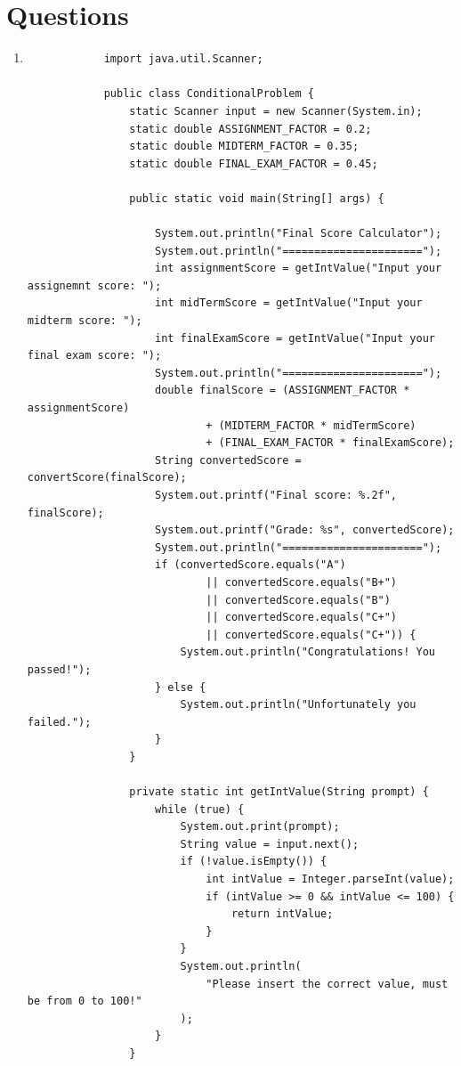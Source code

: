 \documentclass[12pt,titlepage]{article}
\begin{document}
\section*{Questions}
\begin{enumerate}
    \item {
        \begin{verbatim}
            import java.util.Scanner;

            public class ConditionalProblem {
                static Scanner input = new Scanner(System.in);
                static double ASSIGNMENT_FACTOR = 0.2;
                static double MIDTERM_FACTOR = 0.35;
                static double FINAL_EXAM_FACTOR = 0.45;

                public static void main(String[] args) {

                    System.out.println("Final Score Calculator");
                    System.out.println("======================");
                    int assignmentScore = getIntValue("Input your assignemnt score: ");
                    int midTermScore = getIntValue("Input your midterm score: ");
                    int finalExamScore = getIntValue("Input your final exam score: ");
                    System.out.println("======================");
                    double finalScore = (ASSIGNMENT_FACTOR * assignmentScore)
                            + (MIDTERM_FACTOR * midTermScore)
                            + (FINAL_EXAM_FACTOR * finalExamScore);
                    String convertedScore = convertScore(finalScore);
                    System.out.printf("Final score: %.2f", finalScore);
                    System.out.printf("Grade: %s", convertedScore);
                    System.out.println("======================");
                    if (convertedScore.equals("A")
                            || convertedScore.equals("B+")
                            || convertedScore.equals("B")
                            || convertedScore.equals("C+")
                            || convertedScore.equals("C+")) {
                        System.out.println("Congratulations! You passed!");
                    } else {
                        System.out.println("Unfortunately you failed.");
                    }
                }

                private static int getIntValue(String prompt) {
                    while (true) {
                        System.out.print(prompt);
                        String value = input.next();
                        if (!value.isEmpty()) {
                            int intValue = Integer.parseInt(value);
                            if (intValue >= 0 && intValue <= 100) {
                                return intValue;
                            }
                        }
                        System.out.println(
                            "Please insert the correct value, must be from 0 to 100!"
                        );
                    }
                }


\end{verbatim}}
\end{enumerate}
\end{document}
